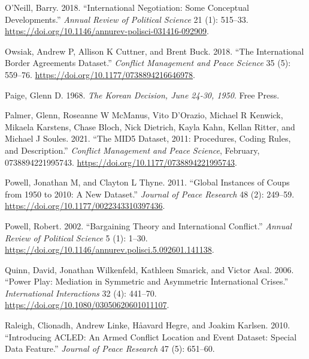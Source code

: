 \documentclass{article}
\newlength{\cslhangindent}
\newlength{\cslentryspacingunit} %
\newenvironment{CSLReferences}[2] %
 {%
  \setlength{\parindent}{0pt}
  \ifodd #1
  \let\oldpar\par
  \def\par{\hangindent=\cslhangindent\oldpar}
  \fi
  \setlength{\parskip}{#2\cslentryspacingunit}
 }%
 {}
\begin{document}
\begin{CSLReferences}{1}{0}
\leavevmode{}%
O'Neill, Barry. 2018. {``International {Negotiation}: {Some Conceptual
Developments}.''} \emph{Annual Review of Political Science} 21 (1):
515--33. \url{https://doi.org/10.1146/annurev-polisci-031416-092909}.

\leavevmode{}%
Owsiak, Andrew P, Allison K Cuttner, and Brent Buck. 2018. {``The
{International Border Agreements Dataset}.''} \emph{Conflict Management
and Peace Science} 35 (5): 559--76.
\url{https://doi.org/10.1177/0738894216646978}.

\leavevmode{}%
Paige, Glenn D. 1968. \emph{The {Korean Decision}, {June} 24-30, 1950}.
{Free Press}.

\leavevmode{}%
Palmer, Glenn, Roseanne W McManus, Vito D'Orazio, Michael R Kenwick,
Mikaela Karstens, Chase Bloch, Nick Dietrich, Kayla Kahn, Kellan Ritter,
and Michael J Soules. 2021. {``The {MID5 Dataset}, 2011:
{Procedures}, Coding Rules, and Description.''} \emph{Conflict
Management and Peace Science}, February, 0738894221995743.
\url{https://doi.org/10.1177/0738894221995743}.

\leavevmode{}%
Powell, Jonathan M, and Clayton L Thyne. 2011. {``Global Instances of
Coups from 1950 to 2010: {A} New Dataset.''} \emph{Journal of Peace
Research} 48 (2): 249--59.
\url{https://doi.org/10.1177/0022343310397436}.

\leavevmode{}%
Powell, Robert. 2002. {``Bargaining {Theory} and {International
Conflict}.''} \emph{Annual Review of Political Science} 5 (1): 1--30.
\url{https://doi.org/10.1146/annurev.polisci.5.092601.141138}.

\leavevmode{}%
Quinn, David, Jonathan Wilkenfeld, Kathleen Smarick, and Victor Asal.
2006. {``Power {Play}: {Mediation} in {Symmetric} and {Asymmetric
International Crises}.''} \emph{International Interactions} 32 (4):
441--70. \url{https://doi.org/10.1080/03050620601011107}.

\leavevmode{}%
Raleigh, Clionadh, Andrew Linke, Håavard Hegre, and Joakim Karlsen.
2010. {``Introducing {ACLED}: An Armed Conflict Location and Event
Dataset: Special Data Feature.''} \emph{Journal of Peace Research} 47
(5): 651--60.


\end{CSLReferences}
\end{document}
